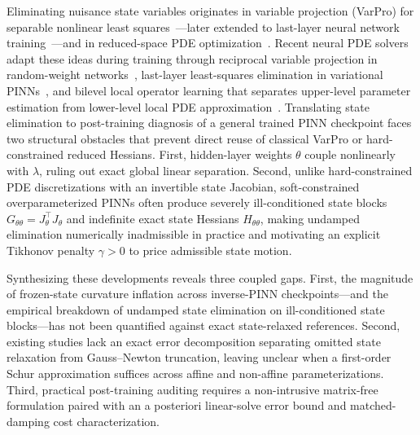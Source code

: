 \documentclass[preprint,11pt]{elsarticle}
\newcommand{\Jt}{J_\theta}\newcommand{\Jl}{J_\lambda}
\begin{document}
Eliminating nuisance state variables originates in variable projection (VarPro) for separable nonlinear least squares~\cite{golub1973variable,golub2003separable}---later extended to last-layer neural network training~\cite{newman2021varpro}---and in reduced-space PDE optimization~\cite{biros2005parallel,buithanh2013computational}.
Recent neural PDE solvers adapt these ideas during training through reciprocal variable projection in random-weight networks~\cite{dong2023inverse}, last-layer least-squares elimination in variational PINNs~\cite{uriarte2025least}, and bilevel local operator learning that separates upper-level parameter estimation from lower-level local PDE approximation~\cite{zhang2026bilo}.
Translating state elimination to post-training diagnosis of a general trained PINN checkpoint faces two structural obstacles that prevent direct reuse of classical VarPro or hard-constrained reduced Hessians.
First, hidden-layer weights $\theta$ couple nonlinearly with $\lambda$, ruling out exact global linear separation.
Second, unlike hard-constrained PDE discretizations with an invertible state Jacobian, soft-constrained overparameterized PINNs often produce severely ill-conditioned state blocks $G_{\theta\theta}=\Jt^\top\Jt$ and indefinite exact state Hessians $H_{\theta\theta}$, making undamped elimination numerically inadmissible in practice and motivating an explicit Tikhonov penalty $\gamma>0$ to price admissible state motion.

Synthesizing these developments reveals three coupled gaps.
First, the magnitude of frozen-state curvature inflation across inverse-PINN checkpoints---and the empirical breakdown of undamped state elimination on ill-conditioned state blocks---has not been quantified against exact state-relaxed references.
Second, existing studies lack an exact error decomposition separating omitted state relaxation from Gauss--Newton truncation, leaving unclear when a first-order Schur approximation suffices across affine and non-affine parameterizations.
Third, practical post-training auditing requires a non-intrusive matrix-free formulation paired with an a posteriori linear-solve error bound and matched-damping cost characterization.
\end{document}
